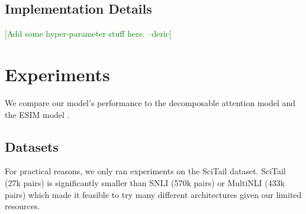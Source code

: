 \documentclass[11pt,a4paper]{article}
\newcommand{\dpcomment}[1]{\textcolor{green}{[#1 --deric]}}
\begin{document}
\subsection{Implementation Details}
\dpcomment{Add some hyper-parameter stuff here.}

\section{Experiments}

We compare our model's performance to the decomposable attention model
\citep{Parikh2016-em} and the ESIM model \citep{Chen2016-wl}.

\begin{table}[h]
\centering
{}
\label{table:experiments}
\caption{\dpcomment{think of a good caption, fix the version numbers}}
\end{table}

\subsection{Datasets}
For practical reasons, we only ran experiments on the SciTail dataset. SciTail (27k pairs) is
significantly smaller than SNLI (570k pairs) \citep{Bowman2015-is} or MultiNLI (433k pairs)
\citep{Williams2017-uh} which made it feasible to try many different architectures given
our limited resources.
\end{document}
